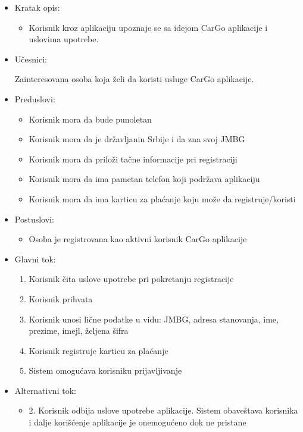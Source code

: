 \begin{itemize}
    \item Kratak opis:
        \begin{itemize}
            \item Korisnik kroz aplikaciju upoznaje se sa idejom CarGo aplikacije i uslovima upotrebe.
        \end{itemize}
    \item Učesnici:
        \begin{itemize}
            Zainteresovana osoba koja želi da koristi usluge CarGo aplikacije.
        \end{itemize}
    \item Preduslovi:
        \begin{itemize}
            \item Korisnik mora da bude punoletan
            \item Korisnik mora da je državljanin Srbije i da zna svoj JMBG
            \item Korisnik mora da priloži tačne informacije pri registraciji
            \item Korisnik mora da ima pametan telefon koji podržava aplikaciju
            \item Korisnik mora da ima karticu za plaćanje koju može da registruje/koristi
        \end{itemize}
    \item Postuslovi:
        \begin{itemize}
            \item Osoba je registrovana kao aktivni korisnik CarGo aplikacije
        \end{itemize}
    \item Glavni tok:
        \begin{enumerate}
            \item Korisnik čita uslove upotrebe pri pokretanju registracije
            \item Korisnik prihvata 
            \item Korisnik unosi lične podatke u vidu: JMBG, adresa stanovanja, ime, prezime, imejl, željena šifra
            \item Korisnik registruje karticu za plaćanje
            \item Sistem omogućava korisniku prijavljivanje
        \end{enumerate}
    \item Alternativni tok:
        \begin{itemize}
            \item 2. Korisnik odbija uslove upotrebe aplikacije. Sistem obaveštava korisnika i dalje korišćenje aplikacije je onemogućeno dok ne pristane

\end{itemize}
\end{itemize}
